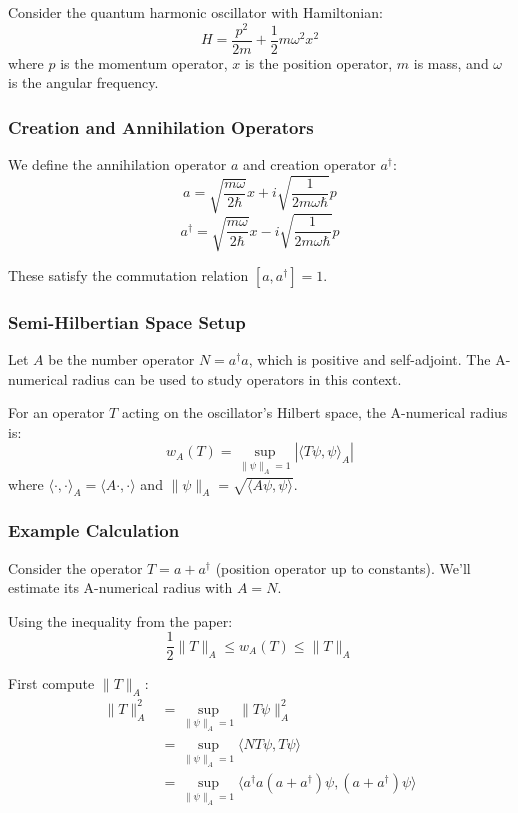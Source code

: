 \documentclass{article}
\begin{document}
Consider the quantum harmonic oscillator with Hamiltonian:
\[ H = \frac{p^2}{2m} + \frac{1}{2}m\omega^2 x^2 \]
where $p$ is the momentum operator, $x$ is the position operator, $m$ is mass, and $\omega$ is the angular frequency.

\subsubsection{Creation and Annihilation Operators}

We define the annihilation operator $a$ and creation operator $a^\dagger$:
\[ a = \sqrt{\frac{m\omega}{2\hbar}}x + i\sqrt{\frac{1}{2m\omega\hbar}}p \]
\[ a^\dagger = \sqrt{\frac{m\omega}{2\hbar}}x - i\sqrt{\frac{1}{2m\omega\hbar}}p \]

These satisfy the commutation relation $[a, a^\dagger] = 1$.

\subsubsection{Semi-Hilbertian Space Setup}

Let $A$ be the number operator $N = a^\dagger a$, which is positive and self-adjoint. The A-numerical radius can be used to study operators in this context.

For an operator $T$ acting on the oscillator's Hilbert space, the A-numerical radius is:
\[ w_A(T) = \sup_{\|\psi\|_A=1} |\langle T\psi, \psi\rangle_A| \]
where $\langle \cdot, \cdot \rangle_A = \langle A\cdot, \cdot \rangle$ and $\|\psi\|_A = \sqrt{\langle A\psi, \psi\rangle}$.

\subsubsection{Example Calculation}

Consider the operator $T = a + a^\dagger$ (position operator up to constants). We'll estimate its A-numerical radius with $A = N$.

Using the inequality from the paper:
\[ \frac{1}{2}\|T\|_A \leq w_A(T) \leq \|T\|_A \]

First compute $\|T\|_A$:
\begin{align*}
\|T\|_A^2 &= \sup_{\|\psi\|_A=1} \|T\psi\|_A^2 \\
&= \sup_{\|\psi\|_A=1} \langle NT\psi, T\psi \rangle \\
&= \sup_{\|\psi\|_A=1} \langle a^\dagger a(a + a^\dagger)\psi, (a + a^\dagger)\psi \rangle
\end{align*}
\end{document}
